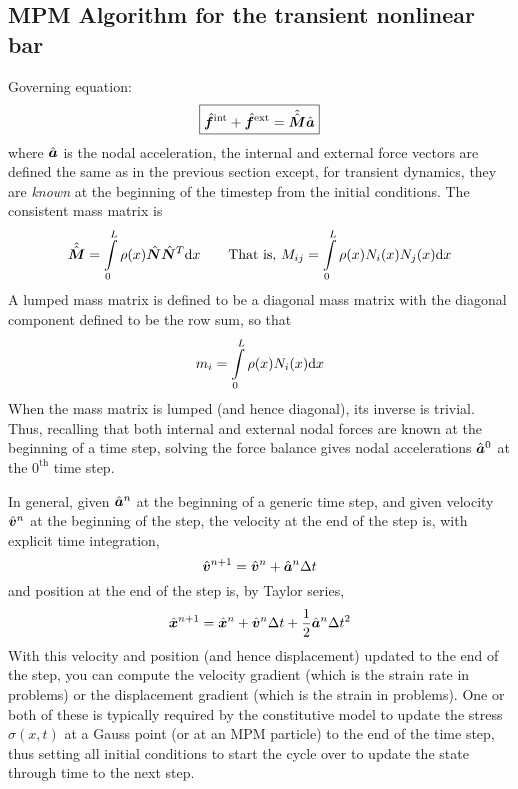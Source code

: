 \subsection{MPM Algorithm for the \oneD transient nonlinear bar}
Governing equation:
\begin{equation}
 \boxed{\hat{\bm{f}}^\text{int} +  \hat{\bm{f}}^\text{ext} = \hat{\hat{\bm{M}}}\hat{\bm{a}}}
\label{eq:discrFequalMa}
\end{equation}
where $\hat{\bm{a}}$ is the nodal acceleration, the internal and external force vectors are defined the same as in the previous section except, for transient dynamics, they are \emph{known} at the beginning of the timestep from the initial conditions.  The consistent mass matrix is
\begin{equation}
  \hat{\hat{\bm{M}}}=\int\limits_0^L \rho(x)\hat{\bm{N}} \hat{\bm{N}}^T \mathrm{d} x
\qquad\text{That is, }
  M_{ij}=\int\limits_0^L \rho(x){N}_i(x) {N}_j(x) \mathrm{d} x
\end{equation}
A lumped mass matrix is defined to be a diagonal mass matrix with the \ith diagonal component defined to be the \ith row sum, so that
\begin{equation}
  m_i=\int\limits_0^L \rho(x){N}_i(x) \mathrm{d} x
\end{equation}
When the mass matrix is lumped (and hence diagonal), its inverse is trivial. Thus, recalling that both internal and external nodal forces are known at the beginning of a time step, solving the force balance gives nodal accelerations $\hat{\bm{a}}^0$ at the $0^\text{th}$ time step.  

In general, given $\hat{\bm{a}}^n$ at the beginning of a generic \nth time step, and given velocity $\hat{\bm{v}}^n$ at the beginning of the step, the velocity at the end of the step is, with explicit time integration,
\begin{equation}
  \hat{\bm{v}}^{n+1}=\hat{\bm{v}}^{n}+\hat{\bm{a}}^n \Delta {\ensuremath{t}}
\end{equation}
and position at the end of the step is, by Taylor series,
\begin{equation}
  \hat{\bm{x}}^{n+1}=\hat{\bm{x}}^{n}+\hat{\bm{v}}^n \Delta {\ensuremath{t}}+\frac{1}{2}\hat{\bm{a}}^n \Delta{\ensuremath{t}}^2
\end{equation}
With this velocity and position (and hence displacement) updated to the end of the step, you can compute the velocity gradient (which is the strain rate in \oneD problems) or the displacement gradient (which is the strain in \oneD problems). One or both of these is typically required by the constitutive model to update the stress $\sigma(x,t)$ at a Gauss point (or at an MPM particle) to the end of the time step, thus setting all initial conditions to start the cycle over to update the state through time to the next step. 

